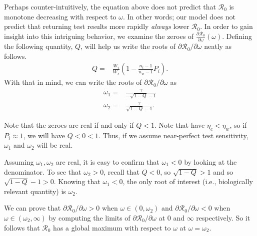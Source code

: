 \documentclass[12pt]{article}
\newcommand{\Rnum}{\mathcal{R}_0}
\theoremstyle{definition} %
\begin{document}
Perhaps counter-intuitively, the equation above does not predict that $\Rnum$ is monotone decreasing with respect to $\omega$. In other words; our model does not predict that returning test results more rapidly \textit{always} lower $\Rnum$. In order to gain insight into this intriguing behavior, we examine the zeroes of $\frac{\partial{\Rnum}}{\partial{\omega}}(\omega)$.
Defining the following quantity, $Q$, will help us write the roots of $\partial{\Rnum}/\partial{\omega}$ neatly as follows.
\begin{align}\label{eq:defQ}
    Q =& \frac{W_i}{W_s}\left(1-\frac{n_{t}-1}{n_{w}-1}P_{i}\right).
\end{align}
With that in mind, we can write the roots of $\partial{\Rnum}/\partial{\omega}$ as
\begin{align}
    \omega_1 =& \frac{\gamma}{-\sqrt{1-Q}-1} \\
    \omega_2 =& \frac{\gamma}{\sqrt{1-Q}-1}.
\end{align}

Note that the zeroes are real if and only if $Q < 1$. Note that have $\eta_c < \eta_w$, so if $P_i \approx 1$, we will have $Q < 0 < 1$. Thus, if we assume near-perfect test sensitivity, $\omega_1$ and $\omega_2$ will be real. 

Assuming $\omega_1, \omega_2$ are real, it is easy to confirm that $\omega_1 < 0$ by looking at the denominator. To see that $\omega_2 > 0$, recall that $Q < 0$, so $\sqrt{1-Q} > 1$ and so $\sqrt{1-Q} -1 > 0$. Knowing that $\omega_1 < 0$, the only root of interest (i.e., biologically relevant quantity) is $\omega_2$. 

We can prove that $\partial{\Rnum}/\partial{\omega} > 0$ when $\omega \in (0,\omega_2)$ and $\partial{\Rnum}/\partial{\omega} < 0$ when $\omega \in (\omega_2,\infty)$ by computing the limits of $\partial{\Rnum}/\partial{\omega}$ at $0$ and $\infty$ respectively. So it follows that $\Rnum$ has a global maximum with respect to $\omega$ at $\omega = \omega_2$.
\end{document}
